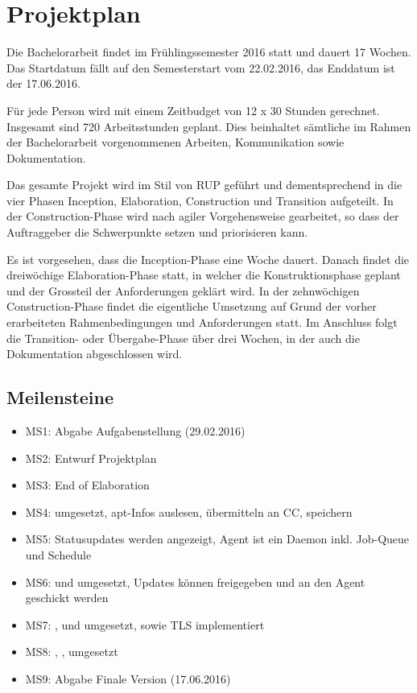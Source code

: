 \chapter{Projektplan}
\label{appendix:project_plan}

Die Bachelorarbeit findet im Frühlingssemester 2016 statt und dauert 17 Wochen. Das Startdatum fällt auf den Semesterstart vom 22.02.2016, das Enddatum ist der 17.06.2016.

Für jede Person wird mit einem Zeitbudget von 12 x 30 Stunden gerechnet. Insgesamt sind 720 Arbeitsstunden geplant. Dies beinhaltet sämtliche im Rahmen der Bachelorarbeit vorgenommenen Arbeiten, Kommunikation sowie Dokumentation.

Das gesamte Projekt wird im Stil von RUP geführt und dementsprechend in die vier Phasen Inception, Elaboration, Construction und Transition aufgeteilt. In der Construction-Phase wird nach agiler Vorgehensweise gearbeitet, so dass der Auftraggeber die Schwerpunkte setzen und priorisieren kann.

Es ist vorgesehen, dass die Inception-Phase eine Woche dauert. Danach findet die dreiwöchige Elaboration-Phase statt, in welcher die Konstruktionsphase geplant und der Grossteil der Anforderungen geklärt wird.
In der zehnwöchigen Construction-Phase findet die eigentliche Umsetzung auf Grund der vorher erarbeiteten Rahmenbedingungen und Anforderungen statt. Im Anschluss folgt die Transition- oder Übergabe-Phase über drei Wochen, in der auch die Dokumentation abgeschlossen wird.


\section*{Meilensteine}

\begin{itemize}
    \item MS1: Abgabe Aufgabenstellung (29.02.2016)
    \item MS2: Entwurf Projektplan
    \item MS3: End of Elaboration
    \item MS4:  umgesetzt, apt-Infos auslesen, übermitteln an CC, speichern
    \item MS5: Statusupdates werden angezeigt, Agent ist ein Daemon inkl. Job-Queue und Schedule
    \item MS6:  und  umgesetzt, Updates können freigegeben und an den Agent geschickt werden
    \item MS7: ,  und  umgesetzt, sowie TLS implementiert
    \item MS8: , ,  umgesetzt
    \item MS9: Abgabe Finale Version (17.06.2016)
\end{itemize}


